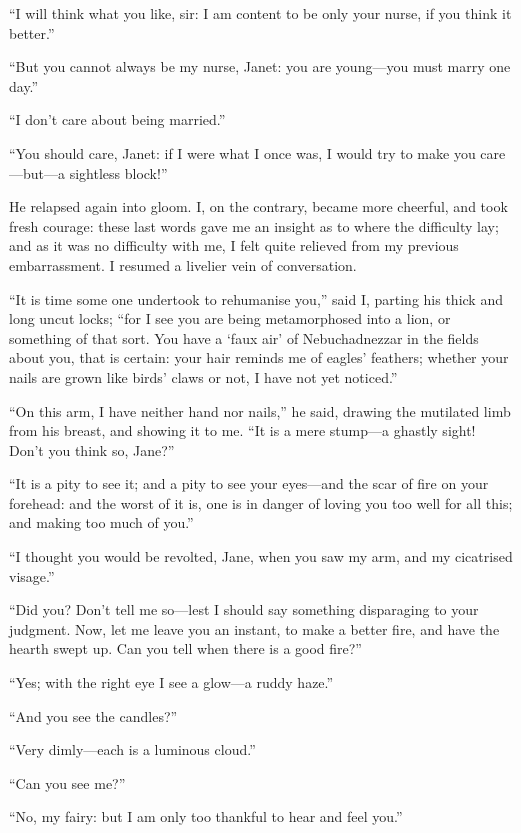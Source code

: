 \enquote{I will think what you like, sir: I am content to be only your
	nurse, if you think it better.}

\enquote{But you cannot always be my nurse, Janet: you are young---you
	must marry one day.}

\enquote{I don't care about being married.}

\enquote{You should care, Janet: if I were what I once was, I would try
	to make you care---but---a sightless block!}

He relapsed again into gloom. I, on the contrary, became more cheerful,
and took fresh courage: these last words gave me an insight as to where
the difficulty lay; and as it was no difficulty with me, I felt quite
relieved from my previous embarrassment. I resumed a livelier vein of
conversation.

\enquote{It is time some one undertook to rehumanise you,} said I,
parting his thick and long uncut locks; \enquote{for I see you are being
	metamorphosed into a lion, or something of that sort. You have a
	\enquote{faux air} of Nebuchadnezzar in the fields about you, that is
	certain: your hair reminds me of eagles' feathers; whether your nails
	are grown like birds' claws or not, I have not yet noticed.}

\enquote{On this arm, I have neither hand nor nails,} he said, drawing
the mutilated limb from his breast, and showing it to me. \enquote{It
	is a mere stump---a ghastly sight! Don't you think so, Jane?}

\enquote{It is a pity to see it; and a pity to see your eyes---and the
	scar of fire on your forehead: and the worst of it is, one is in danger
	of loving you too well for all this; and making too much of you.}

\enquote{I thought you would be revolted, Jane, when you saw my arm, and
	my cicatrised visage.}

\enquote{Did you? Don't tell me so---lest I should say something
	disparaging to your judgment. Now, let me leave you an instant, to make
	a better fire, and have the hearth swept up. Can you tell when there is
	a good fire?}

\enquote{Yes; with the right eye I see a glow---a ruddy haze.}

\enquote{And you see the candles?}

\enquote{Very dimly---each is a luminous cloud.}

\enquote{Can you see me?}

\enquote{No, my fairy: but I am only too thankful to hear and feel you.}

